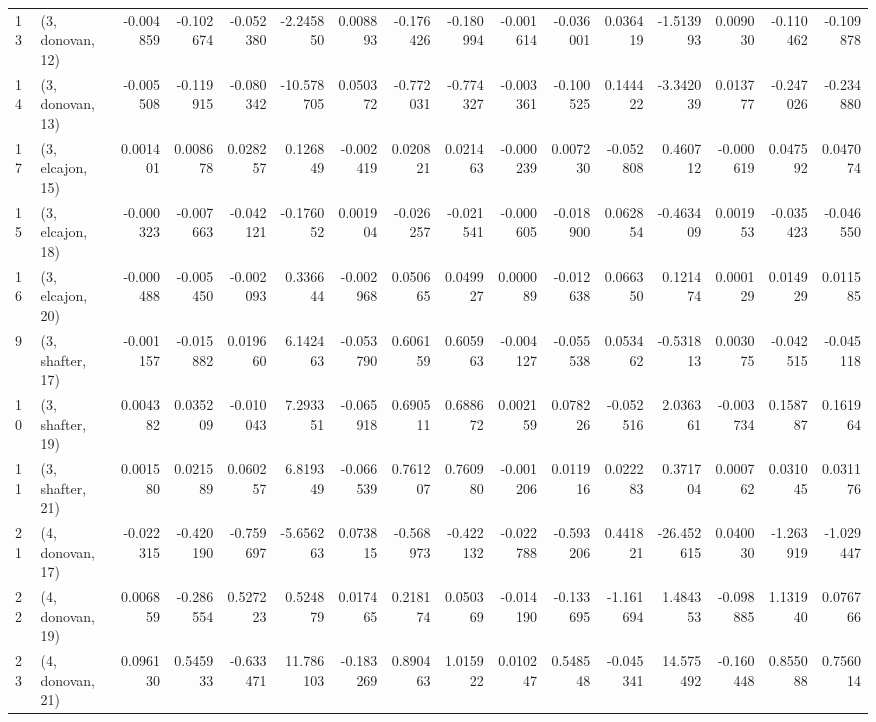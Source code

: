 \begin{tabular}{llrrrrrrrrrrrrrr}
13 &  (3, donovan, 12) &  -0.004859 & -0.102674 & -0.052380 &  -2.245850 &  0.008893 &  -0.176426 & -0.180994 & -0.001614 & -0.036001 &  0.036419 &  -1.513993 &  0.009030 & -0.110462 & -0.109878 \\
14 &  (3, donovan, 13) &  -0.005508 & -0.119915 & -0.080342 & -10.578705 &  0.050372 &  -0.772031 & -0.774327 & -0.003361 & -0.100525 &  0.144422 &  -3.342039 &  0.013777 & -0.247026 & -0.234880 \\
17 &  (3, elcajon, 15) &   0.001401 &  0.008678 &  0.028257 &   0.126849 & -0.002419 &   0.020821 &  0.021463 & -0.000239 &  0.007230 & -0.052808 &   0.460712 & -0.000619 &  0.047592 &  0.047074 \\
15 &  (3, elcajon, 18) &  -0.000323 & -0.007663 & -0.042121 &  -0.176052 &  0.001904 &  -0.026257 & -0.021541 & -0.000605 & -0.018900 &  0.062854 &  -0.463409 &  0.001953 & -0.035423 & -0.046550 \\
16 &  (3, elcajon, 20) &  -0.000488 & -0.005450 & -0.002093 &   0.336644 & -0.002968 &   0.050665 &  0.049927 &  0.000089 & -0.012638 &  0.066350 &   0.121474 &  0.000129 &  0.014929 &  0.011585 \\
9  &  (3, shafter, 17) &  -0.001157 & -0.015882 &  0.019660 &   6.142463 & -0.053790 &   0.606159 &  0.605963 & -0.004127 & -0.055538 &  0.053462 &  -0.531813 &  0.003075 & -0.042515 & -0.045118 \\
10 &  (3, shafter, 19) &   0.004382 &  0.035209 & -0.010043 &   7.293351 & -0.065918 &   0.690511 &  0.688672 &  0.002159 &  0.078226 & -0.052516 &   2.036361 & -0.003734 &  0.158787 &  0.161964 \\
11 &  (3, shafter, 21) &   0.001580 &  0.021589 &  0.060257 &   6.819349 & -0.066539 &   0.761207 &  0.760980 & -0.001206 &  0.011916 &  0.022283 &   0.371704 &  0.000762 &  0.031045 &  0.031176 \\
21 &  (4, donovan, 17) &  -0.022315 & -0.420190 & -0.759697 &  -5.656263 &  0.073815 &  -0.568973 & -0.422132 & -0.022788 & -0.593206 &  0.441821 & -26.452615 &  0.040030 & -1.263919 & -1.029447 \\
22 &  (4, donovan, 19) &   0.006859 & -0.286554 &  0.527223 &   0.524879 &  0.017465 &   0.218174 &  0.050369 & -0.014190 & -0.133695 & -1.161694 &   1.484353 & -0.098885 &  1.131940 &  0.076766 \\
23 &  (4, donovan, 21) &   0.096130 &  0.545933 & -0.633471 &  11.786103 & -0.183269 &   0.890463 &  1.015922 &  0.010247 &  0.548548 & -0.045341 &  14.575492 & -0.160448 &  0.855088 &  0.756014 \\

\end{tabular}
